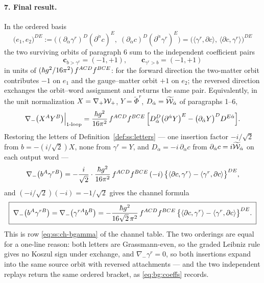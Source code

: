 \paragraph{7. Final result.} In the ordered basis
\begin{equation}\label{eq:bg:basis}
\big(e_{1},e_{2}\big)^{DE} :=\Big((\partial_{\dot\alpha}\gamma^{r})^{D}(\partial^{\dot\alpha}c)^{E},\; (\partial_{\dot\alpha}c)^{D}(\partial^{\dot\alpha}\gamma^{r})^{E}\Big) =\Big(\langle\gamma^{r},\partial c\rangle,\, \langle\partial c,\gamma^{r}\rangle\Big)^{DE}
\end{equation}
the two surviving orbits of paragraph 6 sum to the independent coefficient pairs
\begin{equation}\label{eq:bg:coeffs}
\mathbf c_{b>\gamma^{r}}=(-1,+1), \qquad \mathbf c_{\gamma^{r}>b}=(-1,+1)
\end{equation}
in units of $(\hbar g^{2}/16\pi^{2})\,f^{ACD}f^{BCE}$: for the forward direction the two-matter orbit contributes
$-1$ on $e_{1}$ and the gauge--matter orbit $+1$ on $e_{2}$; the reversed direction exchanges the orbit--word
assignment and returns the same pair. Equivalently, in the unit normalization $X=\nabla_{+}\mathcal{W}_{+}$,
$Y=\widetilde\Phi^{r}$, $D_{\dot\alpha}=\widetilde{\mathcal{W}}_{\dot\alpha}$ of paragraphs 1--6,
\begin{equation}\label{eq:bg:unitresult}
\nabla_{-}\big(X^{A}Y^{B}\big)\Big|_{\mathrm{1\text{-}loop}} =\frac{\hbar g^{2}}{16\pi^{2}}\,f^{ACD}f^{BCE}\, \Big[D_{\dot\alpha}^{D}\big(\partial^{\dot\alpha}Y\big)^{E} -\big(\partial_{\dot\alpha}Y\big)^{D}D^{E\dot\alpha}\Big] .
\end{equation}
Restoring the letters of Definition~\ref{def:ss:letters} --- one insertion factor $-i/\sqrt2$ from
$b=-(i/\sqrt2)X$, none from $\gamma^{r}=Y$, and $D_{\dot\alpha}=-i\,\partial_{\dot\alpha}c$ from
$\partial_{\dot\alpha}c=i\widetilde{\mathcal{W}}_{\dot\alpha}$ on each output word ---
\begin{equation}\label{eq:bg:conversion}
\nabla_{-}\big(b^{A}\gamma^{rB}\big) =-\frac{i}{\sqrt2}\cdot\frac{\hbar g^{2}}{16\pi^{2}}\,f^{ACD}f^{BCE}\, (-i)\,\big\{\langle\partial c,\gamma^{r}\rangle -\langle\gamma^{r},\partial c\rangle\big\}^{DE} ,
\end{equation}
and $(-i/\sqrt2)(-i)=-1/\sqrt2$ gives the channel formula
\begin{equation}\label{eq:bg:final}
\boxed{\; \nabla_{-}\big(b^{A}\gamma^{rB}\big) =\nabla_{-}\big(\gamma^{rA}b^{B}\big) =-\frac{\hbar g^{2}}{16\sqrt2\,\pi^{2}}\,f^{ACD}f^{BCE}\, \big\{\langle\partial c,\gamma^{r}\rangle -\langle\gamma^{r},\partial c\rangle\big\}^{DE} .\;}
\end{equation}
This is row \eqref{eq:ss:ch-bgamma} of the channel table. The two orderings are equal for a one-line reason: both
letters are Grassmann-even, so the graded Leibniz rule gives no Koszul sign under exchange, and
$\nabla_{-}\gamma^{r}=0$, so both insertions expand into the same source orbit with reversed attachments --- and
the two independent replays return the same ordered bracket, as \eqref{eq:bg:coeffs} records.

